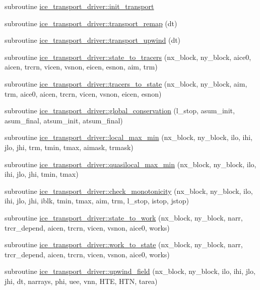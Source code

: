 \begin{DoxyCompactItemize}
\item 
subroutine \hyperlink{namespaceice__transport__driver_a47d0afada16dff37da3f72fa4c27ef86}{ice\_\-transport\_\-driver::init\_\-transport}
\item 
subroutine \hyperlink{namespaceice__transport__driver_aaca5fc744c83b022ee5b5117300cbe8c}{ice\_\-transport\_\-driver::transport\_\-remap} (dt)
\item 
subroutine \hyperlink{namespaceice__transport__driver_ac2fc3fdbf27d4f17ac32c18011940121}{ice\_\-transport\_\-driver::transport\_\-upwind} (dt)
\item 
subroutine \hyperlink{namespaceice__transport__driver_a9820a25e1c9c417a464cd9127254edab}{ice\_\-transport\_\-driver::state\_\-to\_\-tracers} (nx\_\-block, ny\_\-block, aice0, aicen, trcrn, vicen, vsnon, eicen, esnon, aim, trm)
\item 
subroutine \hyperlink{namespaceice__transport__driver_a4f5b07efec9e5b90aca1c9c43c06ba4d}{ice\_\-transport\_\-driver::tracers\_\-to\_\-state} (nx\_\-block, ny\_\-block, aim, trm, aice0, aicen, trcrn, vicen, vsnon, eicen, esnon)
\item 
subroutine \hyperlink{namespaceice__transport__driver_aa19bcb5dc77f4adee16ba36fc1f9e3b5}{ice\_\-transport\_\-driver::global\_\-conservation} (l\_\-stop, asum\_\-init, asum\_\-final, atsum\_\-init, atsum\_\-final)
\item 
subroutine \hyperlink{namespaceice__transport__driver_a1454e3a5f9bdaec16216269fabe0c5b4}{ice\_\-transport\_\-driver::local\_\-max\_\-min} (nx\_\-block, ny\_\-block, ilo, ihi, jlo, jhi, trm, tmin, tmax, aimask, trmask)
\item 
subroutine \hyperlink{namespaceice__transport__driver_a67ed05a8905e21d57703a31ede8ead61}{ice\_\-transport\_\-driver::quasilocal\_\-max\_\-min} (nx\_\-block, ny\_\-block, ilo, ihi, jlo, jhi, tmin, tmax)
\item 
subroutine \hyperlink{namespaceice__transport__driver_a21179a91327fdb3bd51d2e7b5e3b170d}{ice\_\-transport\_\-driver::check\_\-monotonicity} (nx\_\-block, ny\_\-block, ilo, ihi, jlo, jhi, iblk, tmin, tmax, aim, trm, l\_\-stop, istop, jstop)
\item 
subroutine \hyperlink{namespaceice__transport__driver_a922d3b29eea0cadb79c280ead41215ba}{ice\_\-transport\_\-driver::state\_\-to\_\-work} (nx\_\-block, ny\_\-block, narr, trcr\_\-depend, aicen, trcrn, vicen, vsnon, aice0, works)
\item 
subroutine \hyperlink{namespaceice__transport__driver_a20f15deea681c348f6f2032c7db58c50}{ice\_\-transport\_\-driver::work\_\-to\_\-state} (nx\_\-block, ny\_\-block, narr, trcr\_\-depend, aicen, trcrn, vicen, vsnon, aice0, works)
\item 
subroutine \hyperlink{namespaceice__transport__driver_acb90f49777dc049ce780454b1165ed0a}{ice\_\-transport\_\-driver::upwind\_\-field} (nx\_\-block, ny\_\-block, ilo, ihi, jlo, jhi, dt, narrays, phi, uee, vnn, HTE, HTN, tarea)
\end{DoxyCompactItemize}

